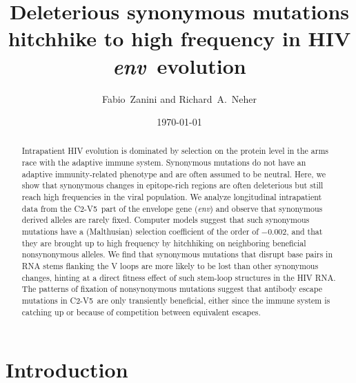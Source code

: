 \documentclass[rmp, twocolumn]{revtex4}
\newcommand{\env}{\textit{env}}
\newcommand{\shankaregion}{C2-V5}
\newcommand{\Author}{Fabio~Zanini and Richard~A.~Neher}
\newcommand{\Title}{Deleterious synonymous mutations hitchhike to high frequency in HIV \env~evolution}
\begin{document}
\title{\Title}
\author{\Author}
\date{\today}

\begin{abstract}
\noindent

Intrapatient HIV evolution is dominated by selection on the protein level in the
arms race with the adaptive immune system. Synonymous mutations do not have an
adaptive immunity-related phenotype and are often assumed to be neutral. Here, we show
that synonymous changes in epitope-rich regions are often deleterious but still
reach high frequencies in the viral population.
We analyze longitudinal intrapatient data from the \shankaregion~part of the
envelope gene (\env) and observe that synonymous derived alleles are rarely
fixed.
Computer models suggest that such synonymous mutations have a (Malthusian) selection
coefficient of the order of $-0.002$, and that they are brought up to high
frequency by hitchhiking on neighboring beneficial nonsynonymous alleles.
We find that synonymous mutations that disrupt base pairs in RNA stems flanking
the V loops are more likely to be lost than other synonymous changes, hinting at
a direct fitness effect of such stem-loop structures in the HIV RNA.
The patterns of fixation of nonsynonymous mutations suggest that antibody
escape mutations in \shankaregion~are only transiently beneficial, either since
the immune system is catching up or because of competition between equivalent
escapes.

\end{abstract}
\maketitle
\section{Introduction}
\end{document}
